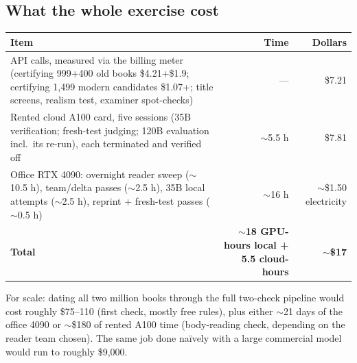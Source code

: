 \documentclass[11pt]{article}
\begin{document}
\subsection*{What the whole exercise cost}
\begin{center}\small
\begin{tabular}{@{}p{8.2cm}rr@{}}
\toprule
\textbf{Item} & \textbf{Time} & \textbf{Dollars}\\
\midrule
API calls, measured via the billing meter (certifying 999+400 old books \$4.21+\$1.9; certifying
1{,}499 modern candidates \$1.07+; title screens, realism test, examiner spot-checks) & --- & \$7.21\\
Rented cloud A100 card, five sessions (35B verification; fresh-test judging; 120B evaluation incl.\
its re-run), each terminated and verified off & $\sim$5.5 h & \$7.81\\
Office RTX 4090: overnight reader sweep ($\sim$10.5 h), team/delta passes ($\sim$2.5 h), 35B local
attempts ($\sim$2.5 h), reprint + fresh-test passes ($\sim$0.5 h) & $\sim$16 h & $\sim$\$1.50 electricity\\
\midrule
\textbf{Total} & \textbf{$\sim$18 GPU-hours local + 5.5 cloud-hours} & \textbf{$\sim$\$17}\\
\bottomrule
\end{tabular}
\end{center}
{\small For scale: dating all two million books through the full two-check pipeline would cost roughly
\$75--110 (first check, mostly free rules), plus either $\sim$21 days of the office 4090 or $\sim$\$180
of rented A100 time (body-reading check, depending on the reader team chosen). The same job done
na\"ively with a large commercial model would run to roughly \$9{,}000.}
\end{document}
